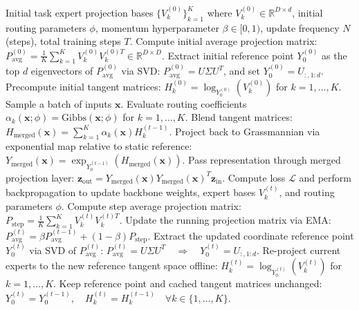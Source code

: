 \documentclass{article}
\theoremstyle{plain}
\theoremstyle{definition}
\theoremstyle{remark}
\begin{document}
\begin{algorithm}[H]
\caption{Momentum-Based Reference Point Update (EMA-C-Lie-MM)}
\label{alg:ema_update}
\begin{algorithmic}[1]
 Initial task expert projection bases $\{V_k^{(0)}\}_{k=1}^K$ where $V_k^{(0)} \in \mathbb{R}^{D \times d}$, initial routing parameters $\phi$, momentum hyperparameter $\beta \in [0, 1)$, update frequency $N$ (steps), total training steps $T$.
\STATE \quad Compute initial average projection matrix: $P_{\text{avg}}^{(0)} = \frac{1}{K} \sum_{k=1}^K V_k^{(0)} V_k^{(0)T} \in \mathbb{R}^{D \times D}$.
\STATE \quad Extract initial reference point $Y_0^{(0)}$ as the top $d$ eigenvectors of $P_{\text{avg}}^{(0)}$ via SVD: $P_{\text{avg}}^{(0)} = U \Sigma U^T$, and set $Y_0^{(0)} = U_{:, 1:d}$.
\STATE \quad Precompute initial tangent matrices: $H_k^{(0)} = \log_{Y_0^{(0)}}\left(V_k^{(0)}\right)$ for $k = 1, \dots, K$.
    \STATE Sample a batch of inputs $\mathbf{x}$.
    \STATE Evaluate routing coefficients $\alpha_k(\mathbf{x}; \phi) = \text{Gibbs}(\mathbf{x}; \phi)$ for $k = 1, \dots, K$.
    \STATE Blend tangent matrices: $H_{\text{merged}}(\mathbf{x}) = \sum_{k=1}^K \alpha_k(\mathbf{x}) H_k^{(t-1)}$.
    \STATE Project back to Grassmannian via exponential map relative to static reference:
    \STATE \quad $Y_{\text{merged}}(\mathbf{x}) = \exp_{Y_0^{(t-1)}}\left( H_{\text{merged}}(\mathbf{x}) \right)$.
    \STATE Pass representation through merged projection layer: $\mathbf{z}_{\text{out}} = Y_{\text{merged}}(\mathbf{x}) Y_{\text{merged}}(\mathbf{x})^T \mathbf{z}_{\text{in}}$.
    \STATE Compute loss $\mathcal{L}$ and perform backpropagation to update backbone weights, expert bases $V_k^{(t)}$, and routing parameters $\phi$.
        \STATE Compute step average projection matrix: $P_{\text{step}} = \frac{1}{K} \sum_{k=1}^K V_k^{(t)} V_k^{(t)T}$.
        \STATE Update the running projection matrix via EMA:
        \STATE \quad $P_{\text{avg}}^{(t)} = \beta P_{\text{avg}}^{(t-1)} + (1 - \beta) P_{\text{step}}$.
        \STATE Extract the updated coordinate reference point $Y_0^{(t)}$ via SVD of $P_{\text{avg}}^{(t)}$:
        \STATE \quad $P_{\text{avg}}^{(t)} = U \Sigma U^T \quad \Longrightarrow \quad Y_0^{(t)} = U_{:, 1:d}$.
        \STATE Re-project current experts to the new reference tangent space offline:
        \STATE \quad $H_k^{(t)} = \log_{Y_0^{(t)}}\left(V_k^{(t)}\right)$ for $k = 1, \dots, K$.
        \ELSE
        \STATE Keep reference point and cached tangent matrices unchanged:
        \STATE \quad $Y_0^{(t)} = Y_0^{(t-1)}, \quad H_k^{(t)} = H_k^{(t-1)} \quad \forall k \in \{1, \dots, K\}$.
        \ENDIF
        \ENDFOR
        \end{algorithmic}
        \end{algorithm}
\end{document}
